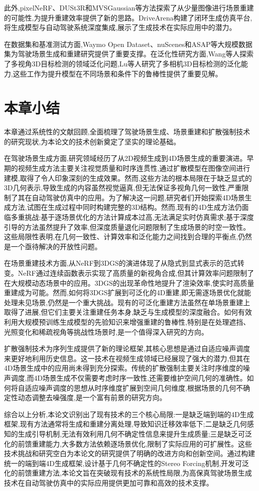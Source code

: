 此外,pixelNeRF\cite{yu2021pixelnerf}、DUSt3R\cite{wang2023dust3r}和MVSGaussian\cite{liu2024mvsgaussian}等方法探索了从少量图像进行场景重建的可能性,为提升重建效率提供了新的思路。DriveArena\cite{yang2024drivearena}构建了闭环生成仿真平台,将生成模型与自动驾驶系统深度集成,展示了生成技术在实际应用中的潜力。

在数据集和基准测试方面,Waymo Open Dataset\cite{sun2020waymo}、nuScenes\cite{caesar2020nuscenes}和ASAP\cite{wang2022asap}等大规模数据集为驾驶场景生成和重建研究提供了重要支撑。在泛化性研究方面,Wang等人\cite{wang2023domain}探索了多视角3D目标检测的领域泛化问题,Lu等人\cite{lu2024generalizable}研究了多相机3D目标检测的泛化能力,这些工作为提升模型在不同场景和条件下的鲁棒性提供了重要见解。

\section{本章小结}

本章通过系统性的文献回顾,全面梳理了驾驶场景生成、场景重建和扩散强制技术的研究现状,为本论文的技术创新奠定了坚实的理论基础。

在驾驶场景生成方面,研究领域经历了从2D视频生成到4D场景生成的重要演进。早期的视频生成方法主要关注视觉质量和时序连贯性,通过扩散模型在图像空间进行建模,取得了令人印象深刻的生成效果。然而,这些方法的根本局限在于缺乏显式的3D几何表示,导致生成的内容虽然视觉逼真,但无法保证多视角几何一致性,严重限制了其在自动驾驶仿真中的应用。为了解决这一问题,研究者们开始探索4D场景生成方法,试图在生成过程中同时构建完整的3D结构。然而,现有的4D生成方法仍面临多重挑战:基于逐场景优化的方法计算成本过高,无法满足实时仿真需求;基于深度引导的方法虽然提升了效率,但深度质量退化问题限制了生成场景的时空一致性。这些局限性表明,在几何一致性、计算效率和泛化能力之间找到合理的平衡点,仍然是一个亟待解决的开放性问题。

在场景重建技术方面,从NeRF到3DGS的演进体现了从隐式到显式表示的范式转变。NeRF通过连续函数表示实现了高质量的新视角合成,但其计算效率问题限制了在大规模动态场景中的应用。3DGS的出现革命性地提升了渲染效率,使实时高质量重建成为可能。然而,如何将3DGS扩展到可泛化的4D重建,即无需逐场景优化就能处理未见场景,仍然是一个重大挑战。现有的可泛化重建方法虽然在单场景重建上取得了进展,但它们主要关注重建任务本身,缺乏与生成模型的深度融合。如何有效利用大规模预训练生成模型的先验知识来增强重建的鲁棒性,特别是在处理遮挡、光照变化和稀疏视角等挑战性场景时,是一个值得深入研究的方向。

扩散强制技术为序列生成提供了新的理论框架,其核心思想是通过自适应噪声调度来更好地利用历史信息。这一技术在视频生成领域已经展现了强大的潜力,但其在4D场景生成中的应用尚未得到充分探索。传统的扩散强制主要关注时序维度的噪声调度,而4D场景生成不仅需要考虑时序一致性,还需要维护空间几何的准确性。如何将自适应噪声调度的思想从时序维度扩展到空间几何维度,根据场景的几何不确定性动态调整去噪强度,是一个富有前景的研究方向。

综合以上分析,本论文识别出了现有技术的三个核心局限:一是缺乏端到端的4D生成框架,现有方法通常将生成和重建分离处理,导致知识迁移效率低下;二是缺乏几何感知的生成引导机制,无法有效利用几何不确定性信息来提升生成质量;三是缺乏可泛化的前馈重建能力,大多数方法依赖逐场景优化,限制了实际应用的可扩展性。这些技术挑战和研究空白为本论文的研究提供了明确的改进方向和创新空间。通过构建统一的端到端4D生成框架,设计基于几何不确定性的Stereo Forcing机制,开发可泛化的前馈重建方法,本论文旨在突破现有技术的系统性局限,为高保真驾驶场景生成技术在自动驾驶仿真中的实际应用提供更加可靠和高效的技术支撑。
